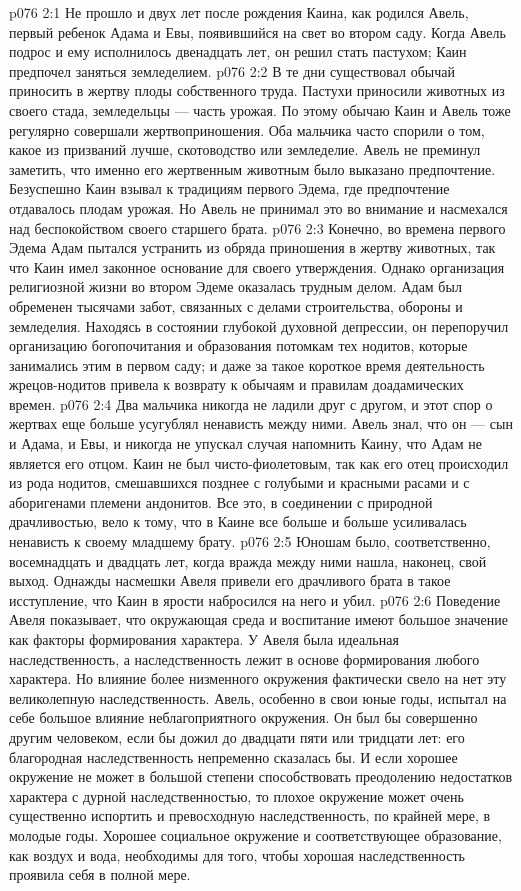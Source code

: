 \vs p076 2:1 Не прошло и двух лет после рождения Каина, как родился Авель, первый ребенок Адама и Евы, появившийся на свет во втором саду. Когда Авель подрос и ему исполнилось двенадцать лет, он решил стать пастухом; Каин предпочел заняться земледелием.
\vs p076 2:2 В те дни существовал обычай приносить в жертву плоды собственного труда. Пастухи приносили животных из своего стада, земледельцы --- часть урожая. По этому обычаю Каин и Авель тоже регулярно совершали жертвоприношения. Оба мальчика часто спорили о том, какое из призваний лучше, скотоводство или земледелие. Авель не преминул заметить, что именно его жертвенным животным было выказано предпочтение. Безуспешно Каин взывал к традициям первого Эдема, где предпочтение отдавалось плодам урожая. Но Авель не принимал это во внимание и насмехался над беспокойством своего старшего брата.
\vs p076 2:3 Конечно, во времена первого Эдема Адам пытался устранить из обряда приношения в жертву животных, так что Каин имел законное основание для своего утверждения. Однако организация религиозной жизни во втором Эдеме оказалась трудным делом. Адам был обременен тысячами забот, связанных с делами строительства, обороны и земледелия. Находясь в состоянии глубокой духовной депрессии, он перепоручил организацию богопочитания и образования потомкам тех нодитов, которые занимались этим в первом саду; и даже за такое короткое время деятельность жрецов\hyp{}нодитов привела к возврату к обычаям и правилам доадамических времен.
\vs p076 2:4 Два мальчика никогда не ладили друг с другом, и этот спор о жертвах еще больше усугублял ненависть между ними. Авель знал, что он --- сын и Адама, и Евы, и никогда не упускал случая напомнить Каину, что Адам не является его отцом. Каин не был чисто\hyp{}фиолетовым, так как его отец происходил из рода нодитов, смешавшихся позднее с голубыми и красными расами и с аборигенами племени андонитов. Все это, в соединении с природной драчливостью, вело к тому, что в Каине все больше и больше усиливалась ненависть к своему младшему брату.
\vs p076 2:5 Юношам было, соответственно, восемнадцать и двадцать лет, когда вражда между ними нашла, наконец, свой выход. Однажды насмешки Авеля привели его драчливого брата в такое исступление, что Каин в ярости набросился на него и убил.
\vs p076 2:6 \pc Поведение Авеля показывает, что окружающая среда и воспитание имеют большое значение как факторы формирования характера. У Авеля была идеальная наследственность, а наследственность лежит в основе формирования любого характера. Но влияние более низменного окружения фактически свело на нет эту великолепную наследственность. Авель, особенно в свои юные годы, испытал на себе большое влияние неблагоприятного окружения. Он был бы совершенно другим человеком, если бы дожил до двадцати пяти или тридцати лет: его благородная наследственность непременно сказалась бы. И если хорошее окружение не может в большой степени способствовать преодолению недостатков характера с дурной наследственностью, то плохое окружение может очень существенно испортить и превосходную наследственность, по крайней мере, в молодые годы. Хорошее социальное окружение и соответствующее образование, как воздух и вода, необходимы для того, чтобы хорошая наследственность проявила себя в полной мере.
